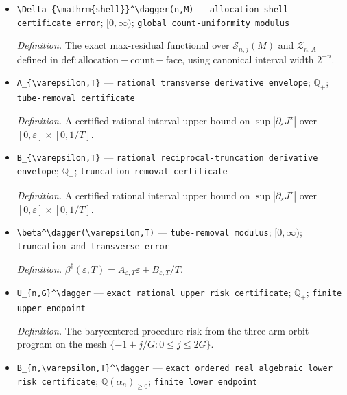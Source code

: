 \documentclass{article}
\begin{document}
\begin{itemize}
  \item \texttt{\textbackslash{}\allowbreak{}Delta\_\allowbreak{}\{\textbackslash{}\allowbreak{}mathrm\{shell\}\allowbreak{}\}\allowbreak{}\textasciicircum{}\textbackslash{}\allowbreak{}dagger(n,\allowbreak{}M)} --- \texttt{allocation-\allowbreak{}shell certificate error}; \([0,\infty)\); \texttt{global count-\allowbreak{}uniformity modulus}
  \par\smallskip\noindent\emph{Definition.} The exact max-residual functional over \(\mathcal S_{n,j}(M)\) and \(\mathcal Z_{n,A}\) defined in \(\mathrm{def:allocation-count-face}\), using canonical interval width \(2^{-n}\).
  \item \texttt{A\_\allowbreak{}\{\textbackslash{}\allowbreak{}varepsilon,\allowbreak{}T\}\allowbreak{}} --- \texttt{rational transverse derivative envelope}; \(\mathbb Q_+\); \texttt{tube-\allowbreak{}removal certificate}
  \par\smallskip\noindent\emph{Definition.} A certified rational interval upper bound on \(\sup|\partial_\varepsilon J^\star|\) over \([0,\varepsilon]\times[0,1/T]\).
  \item \texttt{B\_\allowbreak{}\{\textbackslash{}\allowbreak{}varepsilon,\allowbreak{}T\}\allowbreak{}} --- \texttt{rational reciprocal-\allowbreak{}truncation derivative envelope}; \(\mathbb Q_+\); \texttt{truncation-\allowbreak{}removal certificate}
  \par\smallskip\noindent\emph{Definition.} A certified rational interval upper bound on \(\sup|\partial_s J^\star|\) over \([0,\varepsilon]\times[0,1/T]\).
  \item \texttt{\textbackslash{}\allowbreak{}beta\textasciicircum{}\textbackslash{}\allowbreak{}dagger(\textbackslash{}\allowbreak{}varepsilon,\allowbreak{}T)} --- \texttt{tube-\allowbreak{}removal modulus}; \([0,\infty)\); \texttt{truncation and transverse error}
  \par\smallskip\noindent\emph{Definition.} \(\beta^\dagger(\varepsilon,T)=A_{\varepsilon,T}\varepsilon+B_{\varepsilon,T}/T\).
  \item \texttt{U\_\allowbreak{}\{n,\allowbreak{}G\}\allowbreak{}\textasciicircum{}\textbackslash{}\allowbreak{}dagger} --- \texttt{exact rational upper risk certificate}; \(\mathbb Q_+\); \texttt{finite upper endpoint}
  \par\smallskip\noindent\emph{Definition.} The barycentered procedure risk from the three-arm orbit program on the mesh \(\{-1+j/G:0\le j\le2G\}\).
  \item \texttt{B\_\allowbreak{}\{n,\allowbreak{}\textbackslash{}\allowbreak{}varepsilon,\allowbreak{}T\}\allowbreak{}\textasciicircum{}\textbackslash{}\allowbreak{}dagger} --- \texttt{exact ordered real algebraic lower risk certificate}; \(\mathbb Q(\alpha_n)_{\ge0}\); \texttt{finite lower endpoint}

\end{itemize}
\end{document}
